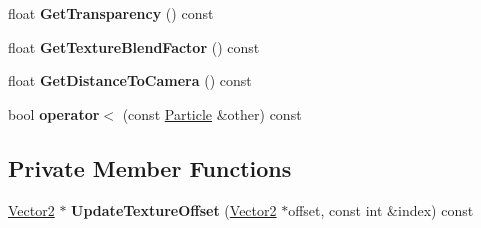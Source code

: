 \begin{DoxyCompactItemize}
\item 
\mbox{\label{class_flounder_1_1_particle_a6869a4843a709b181af09ef5285753dd}} 
float {\bfseries Get\+Transparency} () const
\item 
\mbox{\label{class_flounder_1_1_particle_ae5246af89b590f09dda25984bf693721}} 
float {\bfseries Get\+Texture\+Blend\+Factor} () const
\item 
\mbox{\label{class_flounder_1_1_particle_ab140188b1e9952a54c6ec30b9c561735}} 
float {\bfseries Get\+Distance\+To\+Camera} () const
\item 
\mbox{\label{class_flounder_1_1_particle_adc608b849375b1682052cf5aacc93ba0}} 
bool {\bfseries operator$<$} (const \hyperlink{class_flounder_1_1_particle}{Particle} \&other) const
\end{DoxyCompactItemize}
\subsection*{Private Member Functions}
\begin{DoxyCompactItemize}
\item 
\mbox{\label{class_flounder_1_1_particle_af79c788f9815f888d2ecf1d4eb303b08}} 
\hyperlink{class_flounder_1_1_vector2}{Vector2} $\ast$ {\bfseries Update\+Texture\+Offset} (\hyperlink{class_flounder_1_1_vector2}{Vector2} $\ast$offset, const int \&index) const
\end{DoxyCompactItemize}
